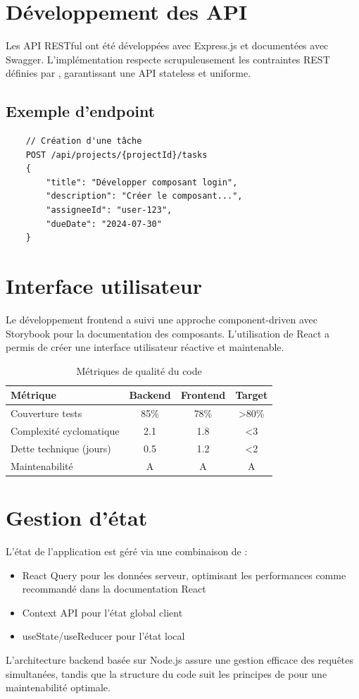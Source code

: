 \section{Développement des API}
Les API RESTful ont été développées avec Express.js et documentées avec Swagger. L'implémentation respecte scrupuleusement les contraintes REST définies par \cite{fielding2000rest}, garantissant une API stateless et uniforme.

\subsection{Exemple d'endpoint}
\begin{verbatim}
	// Création d'une tâche
	POST /api/projects/{projectId}/tasks
	{
		"title": "Développer composant login",
		"description": "Créer le composant...",
		"assigneeId": "user-123",
		"dueDate": "2024-07-30"
	}
\end{verbatim}

\section{Interface utilisateur}
Le développement frontend a suivi une approche component-driven avec Storybook pour la documentation des composants. L'utilisation de React \cite{react2024} a permis de créer une interface utilisateur réactive et maintenable.

\begin{table}[H]
	\centering
	\caption{Métriques de qualité du code}
	\begin{tabular}{lccc}
		\toprule
		\textbf{Métrique} & \textbf{Backend} & \textbf{Frontend} & \textbf{Target} \\
		\midrule
		Couverture tests & 85\% & 78\% & >80\% \\
		Complexité cyclomatique & 2.1 & 1.8 & <3 \\
		Dette technique (jours) & 0.5 & 1.2 & <2 \\
		Maintenabilité & A & A & A \\
		\bottomrule
	\end{tabular}
\end{table}

\section{Gestion d'état}
L'état de l'application est géré via une combinaison de :
\begin{itemize}
	\item React Query pour les données serveur, optimisant les performances comme recommandé dans la documentation React \cite{react2024}
	\item Context API pour l'état global client
	\item useState/useReducer pour l'état local
\end{itemize}

L'architecture backend basée sur Node.js \cite{nodejs2024} assure une gestion efficace des requêtes simultanées, tandis que la structure du code suit les principes de \cite{martin2017clean} pour une maintenabilité optimale.